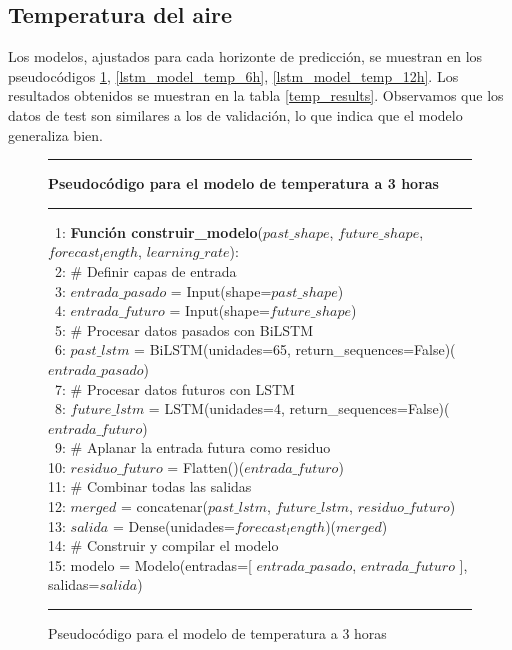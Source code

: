 \subsection{Temperatura del aire}
Los modelos, ajustados para cada horizonte de predicción, se muestran en los pseudocódigos \ref{lstm_model_temp_3h}, \ref{lstm_model_temp_6h}, \ref{lstm_model_temp_12h}.
Los resultados obtenidos se muestran en la tabla \ref{temp_results}. Observamos que los datos de test son similares a los de validación, 
lo que indica que el modelo generaliza bien.

\begin{figure}[H]
{\small
\hrule
{\bf\small Pseudocódigo para el modelo de temperatura a 3 horas}
\hrule
\begin{center}
\begin{tabbing}
\ 1: {\bf Fun}\={\bf ción construir\_modelo}($past\_shape$, $future\_shape$, $forecast_length$, $learning\_rate$): \\
\ 2: \> \# Definir capas de entrada \\
\ 3: \> $entrada\_pasado$ = Input(shape=$past\_shape$) \\
\ 4: \> $entrada\_futuro$ = Input(shape=$future\_shape$) \\
\ 5: \> \# Procesar datos pasados con BiLSTM \\
\ 6: \> $past\_lstm$ = BiLSTM(unidades=65, return\_sequences=False)($entrada\_pasado$) \\
\ 7: \> \# Procesar datos futuros con LSTM \\
\ 8: \> $future\_lstm$ = LSTM(unidades=4, return\_sequences=False)($entrada\_futuro$) \\
\ 9: \> \# Aplanar la entrada futura como residuo \\
10: \> $residuo\_futuro$ = Flatten()($entrada\_futuro$) \\
11: \> \# Combinar todas las salidas \\
12: \> $merged$ = concatenar($past\_lstm$, $future\_lstm$, $residuo\_futuro$) \\
13: \> $salida$ = Dense(unidades=$forecast_length$)($merged$) \\
14: \> \# Construir y compilar el modelo \\
15: \> modelo = Modelo(entradas=[ $entrada\_pasado$, $entrada\_futuro$ ], salidas=$salida$) \\
\end{tabbing}
\end{center}
}
\hrule
\caption{Pseudocódigo para el modelo de temperatura a 3 horas}
\label{lstm_model_temp_3h}
\end{figure}

